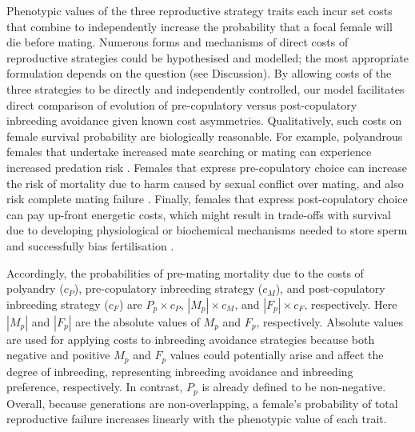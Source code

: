 \documentclass[10pt,letterpaper]{article}
\begin{document}
Phenotypic values of the three reproductive strategy traits each incur set costs that combine to independently increase the probability that a focal female will die before mating. Numerous forms and mechanisms of direct costs of reproductive strategies could be hypothesised and modelled; the most appropriate formulation depends on the question (see Discussion). By allowing costs of the three strategies to be directly and independently controlled, our model facilitates direct comparison of evolution of pre-copulatory versus post-copulatory inbreeding avoidance given known cost asymmetries. Qualitatively, such costs on female survival probability are biologically reasonable. For example, polyandrous females that undertake increased mate searching or mating can experience increased predation risk \cite[e.g.,][]{Rowe1988, Ronkainen1994, Koga1998}. Females that express pre-copulatory choice can increase the risk of mortality due to harm caused by sexual conflict over mating, and also risk complete mating failure \cite[which equates to pre-reproductive mortality in semelparous organisms;][]{Rowe1994, Kokko2013}. Finally, females that express post-copulatory choice can pay up-front energetic costs, which might result in trade-offs with survival due to developing physiological or biochemical mechanisms needed to store sperm and successfully bias fertilisation \cite[e.g.,][]{Gasparini2011, Tuni2013, Fitzpatrick2014}.

Accordingly, the probabilities of pre-mating mortality due to the costs of polyandry ($c_{P}$), pre-copulatory inbreeding strategy ($c_{M}$), and post-copulatory inbreeding strategy ($c_{F}$) are $P_{p} \times c_{P}$, $|M_{p}| \times c_{M}$, and $|F_{p}| \times c_{F}$, respectively. Here $|M_{p}|$ and $|F_{p}|$ are the absolute values of $M_{p}$ and $F_{p}$, respectively. Absolute values are used for applying costs to inbreeding avoidance strategies because both negative and positive $M_{p}$ and $F_{p}$ values could potentially arise and affect the degree of inbreeding, representing inbreeding avoidance and inbreeding preference, respectively. In contrast, $P_{p}$ is already defined to be non-negative. Overall, because generations are non-overlapping, a female's probability of total reproductive failure increases linearly with the phenotypic value of each trait.

\vspace{5 mm}
\end{document}
